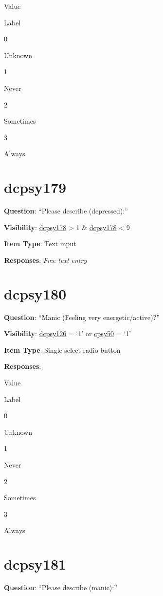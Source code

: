 \documentclass[]{book}
\begin{document}
Value

Label

0

Unknown

1

Never

2

Sometimes

3

Always

\hypertarget{dcpsy179}{%
\section{dcpsy179}\label{dcpsy179}}

\textbf{Question}: ``Please describe (depressed):''

\textbf{Visibility}: \protect\hyperlink{dcpsy178}{dcpsy178} \textgreater{} 1 \& \protect\hyperlink{dcpsy178}{dcpsy178} \textless{} 9

\textbf{Item Type}: Text input

\textbf{Responses}: \emph{Free text entry}

\hypertarget{dcpsy180}{%
\section{dcpsy180}\label{dcpsy180}}

\textbf{Question}: ``Manic (Feeling very energetic/active)?''

\textbf{Visibility}: \protect\hyperlink{dcpsy126}{dcpsy126} = `1' or \protect\hyperlink{cpsy50}{cpsy50} = `1'

\textbf{Item Type}: Single-select radio button

\textbf{Responses}:

Value

Label

0

Unknown

1

Never

2

Sometimes

3

Always

\hypertarget{dcpsy181}{%
\section{dcpsy181}\label{dcpsy181}}

\textbf{Question}: ``Please describe (manic):''
\end{document}
